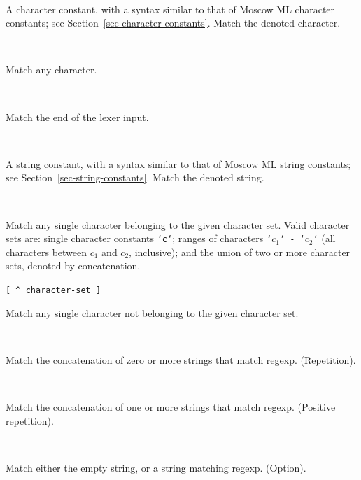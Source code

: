 \documentclass[fleqn]{article}
\begin{document}
\begin{description}
\item[{\tt `{\rm char}`}]\mbox{ }

  A character constant, with a syntax similar to that of Moscow ML
  character constants; see Section~\ref{sec-character-constants}.
  Match the denoted character.

\item[{\tt \_}]\mbox{ }

   Match any character.

\item[{\tt eof}]\mbox{ }

  Match the end of the lexer input.

\item[{\tt "{\rm string}"}]\mbox{ }

  A string constant, with a syntax similar to that of Moscow ML string
  constants; see Section~\ref{sec-string-constants}.  Match the
  denoted string.

\item[{\tt [ {\rm character-set} ]}]\mbox{ }

  Match any single character belonging to the given character set.
  Valid character sets are: single character constants {\tt `c`};
  ranges of characters {\tt `$c_1$` - `$c_2$`} (all characters between
  $c_1$ and $c_2$, inclusive); and the union of two or more character
  sets, denoted by concatenation.

\item{{\tt [ \verb#^# {\rm character-set} ]}}\mbox{ }

  Match any single character not belonging to the given character set.

\item[{\tt {\rm regexp} *}]\mbox{ }

  Match the concatenation of zero or more strings that match regexp.
  (Repetition).

\item[{\tt {\rm regexp} +}]\mbox{ }

  Match the concatenation of one or more strings that match regexp.
  (Positive repetition).

\item[{\tt {\rm regexp} ?}]\mbox{ }

  Match either the empty string, or a string matching regexp.
  (Option).

\item[{\tt {\rm regexp}$_1$ | {\rm regexp}$_2$}]\mbox{ }


\end{description}
\end{document}
